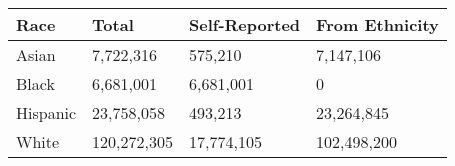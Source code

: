 \begin{tabular}{llll}
\toprule
Race & Total & Self-Reported & From Ethnicity \\
\midrule
Asian & 7,722,316 & 575,210 & 7,147,106 \\
Black & 6,681,001 & 6,681,001 & 0 \\
Hispanic & 23,758,058 & 493,213 & 23,264,845 \\
White & 120,272,305 & 17,774,105 & 102,498,200 \\
\bottomrule
\end{tabular}
